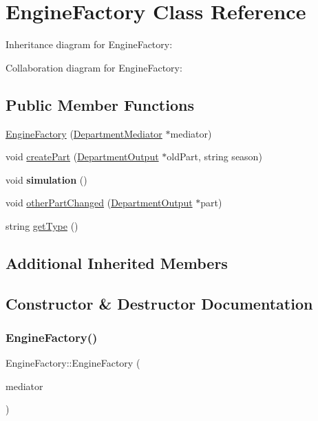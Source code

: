 \hypertarget{classEngineFactory}{}\section{Engine\+Factory Class Reference}
\label{classEngineFactory}


Inheritance diagram for Engine\+Factory\+:


Collaboration diagram for Engine\+Factory\+:
\subsection*{Public Member Functions}
\begin{DoxyCompactItemize}
\item 
\hyperlink{classEngineFactory_aa056855d16da0ce042a66042860b5ae8}{Engine\+Factory} (\hyperlink{classDepartmentMediator}{Department\+Mediator} $\ast$mediator)
\item 
void \hyperlink{classEngineFactory_af8c2f4bf420b5d2f0742b3d38746cf40}{create\+Part} (\hyperlink{classDepartmentOutput}{Department\+Output} $\ast$old\+Part, string season)
\item 
\mbox{\label{classEngineFactory_abcc2b59253cefc7f902a47b19273cf76}} 
void {\bfseries simulation} ()
\item 
void \hyperlink{classEngineFactory_a12c1223834cb2d653a1c659aa1504c51}{other\+Part\+Changed} (\hyperlink{classDepartmentOutput}{Department\+Output} $\ast$part)
\item 
string \hyperlink{classEngineFactory_a52fd49ea32ab2dc62aa8c86e058fb138}{get\+Type} ()
\end{DoxyCompactItemize}
\subsection*{Additional Inherited Members}


\subsection{Constructor \& Destructor Documentation}
\mbox{\label{classEngineFactory_aa056855d16da0ce042a66042860b5ae8}} 
\subsubsection{\texorpdfstring{Engine\+Factory()}{EngineFactory()}}
{\footnotesize\ttfamily Engine\+Factory\+::\+Engine\+Factory (\begin{DoxyParamCaption}\item[{\hyperlink{classDepartmentMediator}{Department\+Mediator} $\ast$}]{mediator }\end{DoxyParamCaption})}



